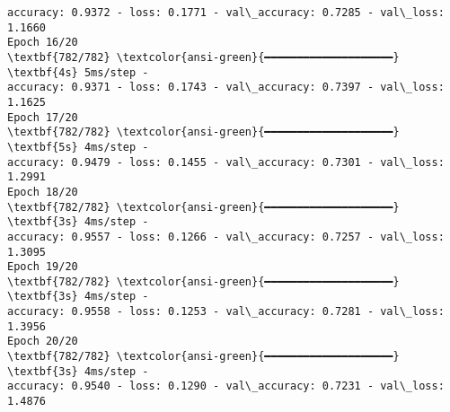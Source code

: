 \documentclass[11pt]{article}
\begin{document}
\begin{Verbatim}[commandchars=\\\{\}]
accuracy: 0.9372 - loss: 0.1771 - val\_accuracy: 0.7285 - val\_loss: 1.1660
Epoch 16/20
\textbf{782/782} \textcolor{ansi-green}{━━━━━━━━━━━━━━━━━━━━} \textbf{4s} 5ms/step -
accuracy: 0.9371 - loss: 0.1743 - val\_accuracy: 0.7397 - val\_loss: 1.1625
Epoch 17/20
\textbf{782/782} \textcolor{ansi-green}{━━━━━━━━━━━━━━━━━━━━} \textbf{5s} 4ms/step -
accuracy: 0.9479 - loss: 0.1455 - val\_accuracy: 0.7301 - val\_loss: 1.2991
Epoch 18/20
\textbf{782/782} \textcolor{ansi-green}{━━━━━━━━━━━━━━━━━━━━} \textbf{3s} 4ms/step -
accuracy: 0.9557 - loss: 0.1266 - val\_accuracy: 0.7257 - val\_loss: 1.3095
Epoch 19/20
\textbf{782/782} \textcolor{ansi-green}{━━━━━━━━━━━━━━━━━━━━} \textbf{3s} 4ms/step -
accuracy: 0.9558 - loss: 0.1253 - val\_accuracy: 0.7281 - val\_loss: 1.3956
Epoch 20/20
\textbf{782/782} \textcolor{ansi-green}{━━━━━━━━━━━━━━━━━━━━} \textbf{3s} 4ms/step -
accuracy: 0.9540 - loss: 0.1290 - val\_accuracy: 0.7231 - val\_loss: 1.4876


\end{Verbatim}
\end{document}
